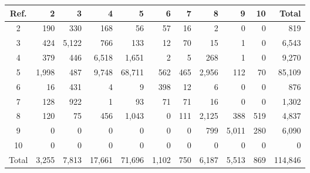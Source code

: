 \begin{tabular}{crrrrrrrrrr}
\toprule
Ref. & 2 & 3 & 4 & 5 & 6 & 7 & 8 & 9 & 10 & Total \\
\midrule
2 & 190 & 330 & 168 & 56 & 57 & 16 & 2 & 0 & 0 & 819 \\
3 & 424 & 5,122 & 766 & 133 & 12 & 70 & 15 & 1 & 0 & 6,543 \\
4 & 379 & 446 & 6,518 & 1,651 & 2 & 5 & 268 & 1 & 0 & 9,270 \\
5 & 1,998 & 487 & 9,748 & 68,711 & 562 & 465 & 2,956 & 112 & 70 & 85,109 \\
6 & 16 & 431 & 4 & 9 & 398 & 12 & 6 & 0 & 0 & 876 \\
7 & 128 & 922 & 1 & 93 & 71 & 71 & 16 & 0 & 0 & 1,302 \\
8 & 120 & 75 & 456 & 1,043 & 0 & 111 & 2,125 & 388 & 519 & 4,837 \\
9 & 0 & 0 & 0 & 0 & 0 & 0 & 799 & 5,011 & 280 & 6,090 \\
10 & 0 & 0 & 0 & 0 & 0 & 0 & 0 & 0 & 0 & 0 \\
\midrule
Total & 3,255 & 7,813 & 17,661 & 71,696 & 1,102 & 750 & 6,187 & 5,513 & 869 & 114,846 \\
\bottomrule
\end{tabular}

